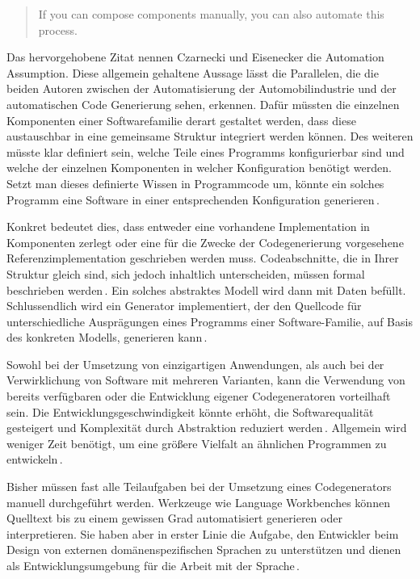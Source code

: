\documentclass[12pt,oneside,a4paper,parskip]{scrbook}
\begin{document}
\begin{quote}
\glqq If you can compose components manually, you can also automate this process.\grqq
\end{quote}

Das hervorgehobene Zitat nennen Czarnecki und Eisenecker die Automation Assumption. Diese allgemein gehaltene Aussage lässt die Parallelen, die die beiden Autoren zwischen der Automatisierung der Automobilindustrie und der automatischen Code Generierung sehen, erkennen. Dafür müssten die einzelnen Komponenten einer Softwarefamilie derart gestaltet werden, dass diese austauschbar in eine gemeinsame Struktur integriert werden können. Des weiteren müsste klar definiert sein, welche Teile eines Programms konfigurierbar sind und welche der einzelnen Komponenten in welcher Konfiguration benötigt werden. Setzt man dieses definierte Wissen in Programmcode um, könnte ein solches Programm eine Software in einer entsprechenden Konfiguration generieren\,\cite{czaeis2000}.

Konkret bedeutet dies, dass entweder eine vorhandene Implementation in Komponenten zerlegt oder eine für die Zwecke der Codegenerierung vorgesehene Referenzimplementation geschrieben werden muss. Codeabschnitte, die in Ihrer Struktur gleich sind, sich jedoch inhaltlich unterscheiden, müssen formal beschrieben werden\,\cite{stahl2007}. Ein solches abstraktes Modell wird dann mit Daten befüllt. Schlussendlich wird ein Generator implementiert, der den Quellcode für unterschiedliche Ausprägungen eines Programms einer Software-Familie, auf Basis des konkreten Modells, generieren kann\,\cite{fowler2010}.

Sowohl bei der Umsetzung von einzigartigen Anwendungen, als auch bei der Verwirklichung von Software mit mehreren Varianten, kann die Verwendung von bereits verfügbaren oder die Entwicklung eigener Codegeneratoren vorteilhaft sein. Die Entwicklungsgeschwindigkeit könnte erhöht, die Softwarequalität gesteigert und Komplexität durch Abstraktion reduziert werden\,\cite{stahl2007}. Allgemein wird weniger Zeit benötigt, um eine größere Vielfalt an ähnlichen Programmen zu entwickeln\,\cite{czaeis2000}.

Bisher müssen fast alle Teilaufgaben bei der Umsetzung eines Codegenerators manuell durchgeführt werden. Werkzeuge wie Language Workbenches können Quelltext bis zu einem gewissen Grad automatisiert generieren oder interpretieren. Sie haben aber in erster Linie die Aufgabe, den Entwickler beim Design von externen domänenspezifischen Sprachen zu unterstützen und dienen als Entwicklungsumgebung für die Arbeit mit der Sprache\,\cite{fowler2010}.
\end{document}
